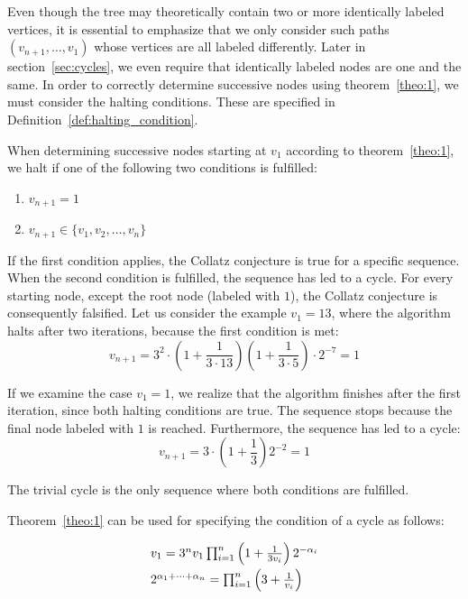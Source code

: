 Even though the tree may theoretically contain two or more identically labeled vertices, it is essential to emphasize that we only consider such paths $(v_{n+1},\ldots,v_1)$ whose vertices are all labeled differently. Later in section~\ref{sec:cycles}, we even require that identically labeled nodes are one and the same. In order to correctly determine successive nodes using theorem~\ref{theo:1}, we must consider the halting conditions. These are specified in Definition~\ref{def:halting_condition}.

\begin{definition}
	\label{def:halting_condition}
	When determining successive nodes starting at $v_1$ according to theorem~\ref{theo:1}, we halt if one of the following two conditions is fulfilled:
	\begin{enumerate}
		\item $v_{n+1}=1$
		\item $v_{n+1}\in\{v_1,v_2,\ldots,v_n\}$
	\end{enumerate}
	If the first condition applies, the Collatz conjecture is true for a specific sequence. When the second condition is fulfilled, the sequence has led to a cycle. For every starting node, except the root node (labeled with $1$), the Collatz conjecture is consequently falsified. Let us consider the example $v_1=13$, where the algorithm halts after two iterations, because the first condition is met:
	\[
	v_{n+1}=3^2\cdot\left(1+\frac{1}{3\cdot13}\right)\left(1+\frac{1}{3\cdot5}\right)\cdot2^{-7}=1
	\]
	
	If we examine the case $v_{1}=1$, we realize that the algorithm finishes after the first iteration, since both halting conditions are true. The sequence stops because the final node labeled with $1$ is reached. Furthermore, the sequence has led to a cycle:
	\[
	v_{n+1}=3\cdot\left(1+\frac{1}{3}\right)2^{-2}=1
	\]
	
	The trivial cycle is the only sequence where both conditions are fulfilled.
\end{definition}

\noindent
Theorem~\ref{theo:1} can be used for specifying the condition of a cycle as follows:

\begin{equation}
\label{eq:func_cycle}
\begin{array}{l}
v_{1}=3^nv_1\prod_{i=1}^{n}\left(1+\frac{1}{3v_i}\right)2^{-\alpha_i}
\\[\medskipamount]
2^{\alpha_1+\cdots+\alpha_n}=\prod_{i=1}^{n}\left(3+\frac{1}{v_i}\right)
\end{array}
\end{equation}

